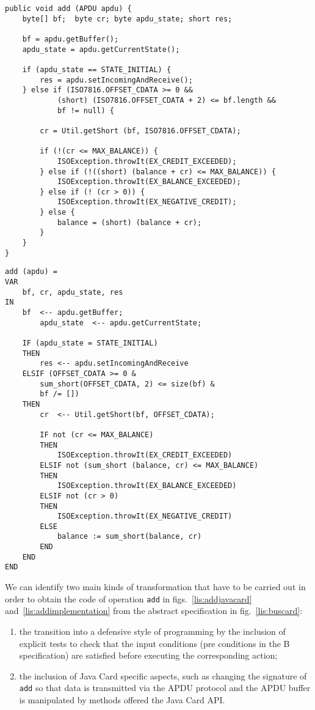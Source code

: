 \documentclass{entcs}
\begin{document}
\begin{lstlisting}
public void add (APDU apdu) { 
	byte[] bf;  byte cr; byte apdu_state; short res;
			
	bf = apdu.getBuffer();
	apdu_state = apdu.getCurrentState();
			
	if (apdu_state == STATE_INITIAL) {
		res = apdu.setIncomingAndReceive();
	} else if (ISO7816.OFFSET_CDATA >= 0 && 
			(short) (ISO7816.OFFSET_CDATA + 2) <= bf.length && 
			bf != null) {
				
		cr = Util.getShort (bf, ISO7816.OFFSET_CDATA);
				
		if (!(cr <= MAX_BALANCE)) {
			ISOException.throwIt(EX_CREDIT_EXCEEDED);
		} else if (!((short) (balance + cr) <= MAX_BALANCE)) {
			ISOException.throwIt(EX_BALANCE_EXCEEDED);
		} else if (! (cr > 0)) {
			ISOException.throwIt(EX_NEGATIVE_CREDIT);
		} else {
			balance = (short) (balance + cr);
		}
	} 
}
\end{lstlisting}

\begin{lstlisting}
add (apdu) = 
VAR 
	bf, cr, apdu_state, res
IN
	bf  <-- apdu.getBuffer;		
    	apdu_state  <-- apdu.getCurrentState;
	    
	IF (apdu_state = STATE_INITIAL) 
	THEN
		res <-- apdu.setIncomingAndReceive                
	ELSIF (OFFSET_CDATA >= 0 &
		sum_short(OFFSET_CDATA, 2) <= size(bf) & 
		bf /= [])
	THEN 
		cr  <-- Util.getShort(bf, OFFSET_CDATA);
		    
		IF not (cr <= MAX_BALANCE)
		THEN 
			ISOException.throwIt(EX_CREDIT_EXCEEDED)
		ELSIF not (sum_short (balance, cr) <= MAX_BALANCE)
		THEN 
			ISOException.throwIt(EX_BALANCE_EXCEEDED)
		ELSIF not (cr > 0)
		THEN 
			ISOException.throwIt(EX_NEGATIVE_CREDIT) 
		ELSE  
			balance := sum_short(balance, cr)
		END
	END
END
\end{lstlisting}


We can identify two main kinds of transformation that have to be
carried out in order to obtain the code of operation \texttt{add} in
figs.~\ref{lis:addjavacard} and~\ref{lis:addimplementation} from the
abstract specification in fig.~\ref{lis:buscard}:

\begin{enumerate}
\item the transition into a defensive style of programming by the
  inclusion of explicit tests to check that the input conditions (pre
  conditions in the B specification) are satisfied before executing
  the corresponding action;

\item the inclusion of Java Card specific aspects, such as changing
  the signature of \texttt{add} so that data is transmitted via the
  APDU protocol and the APDU buffer is manipulated by methods offered
  the Java Card API.

\end{enumerate}
\end{document}
